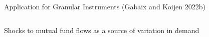 \documentclass[notes,11pt, aspectratio=169]{beamer}
\newenvironment{wideitemize}{\itemize\addtolength{\itemsep}{10pt}}{\enditemize}
\begin{document}
\begin{frame}{Application for Granular Instruments (Gabaix and Koijen 2022b)}
\begin{columns}[T] %
\begin{column}{.5\textwidth}
  \begin{wideitemize}
  \item Shocks to mutual fund flows as a source of variation in demand
  \end{wideitemize}
\end{column}%
\hfill%
\begin{column}{.5\textwidth}
\end{column}%
\end{columns}
\end{frame}
\end{document}

